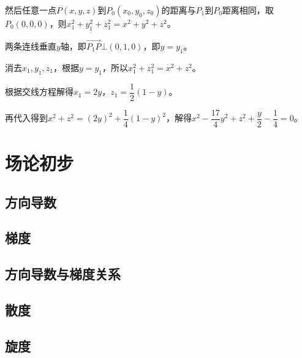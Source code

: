 \documentclass[UTF8, 12pt]{ctexart}
\begin{document}
然后任意一点$P(x,y,z)$到$P_0(x_0,y_0,z_0)$的距离与$P_1$到$P_0$距离相同，取$P_0(0,0,0)$，则$x_1^2+y_1^2+z_1^2=x^2+y^2+z^2$。

两条连线垂直$y$轴，即$\overrightarrow{P_1P}\bot(0,1,0)$，即$y=y_1$。

消去$x_1,y_1,z_1$，根据$y=y_1$，所以$x_1^2+z_1^2=x^2+z^2$。

根据交线方程解得$x_1=2y$，$z_1=\dfrac{1}{2}(1-y)$。

再代入得到$x^2+z^2=(2y)^2+\dfrac{1}{4}(1-y)^2$，解得$x^2-\dfrac{17}{4}y^2+z^2+\dfrac{y}{2}-\dfrac{1}{4}=0$。

\section{场论初步}

\subsection{方向导数}

\subsection{梯度}

\subsection{方向导数与梯度关系}

\subsection{散度}

\subsection{旋度}
\end{document}
